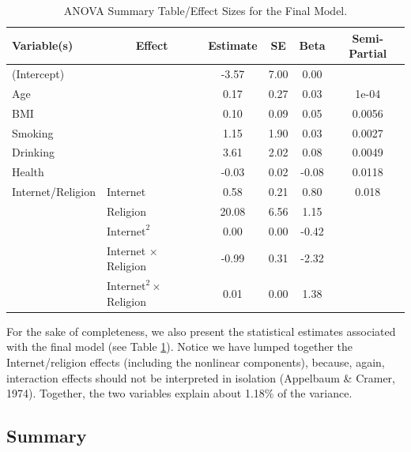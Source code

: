 \documentclass[
  man,floatsintext]{apa6}
\begin{document}
\begin{table}[tbp]

\begin{center}
\begin{threeparttable}

\caption{\label{tab:finalmodests}ANOVA Summary Table/Effect Sizes for the Final Model.}

\begin{tabular}{llcccc}
\toprule
Variable(s) & \multicolumn{1}{c}{Effect} & \multicolumn{1}{c}{Estimate} & \multicolumn{1}{c}{SE} & \multicolumn{1}{c}{Beta} & \multicolumn{1}{c}{Semi-Partial}\\
\midrule
(Intercept) &  & -3.57 & 7.00 & 0.00 & \\
Age &  & 0.17 & 0.27 & 0.03 & 1e-04\\
BMI &  & 0.10 & 0.09 & 0.05 & 0.0056\\
Smoking &  & 1.15 & 1.90 & 0.03 & 0.0027\\
Drinking &  & 3.61 & 2.02 & 0.08 & 0.0049\\
Health &  & -0.03 & 0.02 & -0.08 & 0.0118\\
Internet/Religion & Internet & 0.58 & 0.21 & 0.80 & 0.018\\
 & Religion & 20.08 & 6.56 & 1.15 & \\
 & $\text{Internet}^2$ & 0.00 & 0.00 & -0.42 & \\
 & Internet $\times$ Religion & -0.99 & 0.31 & -2.32 & \\
 & $\text{Internet}^2 \times$ Religion & 0.01 & 0.00 & 1.38 & \\
\bottomrule
\end{tabular}

\end{threeparttable}
\end{center}

\end{table}

For the sake of completeness, we also present the statistical estimates associated with the final model (see Table \ref{tab:finalmodests}). Notice we have lumped together the Internet/religion effects (including the nonlinear components), because, again, interaction effects should not be interpreted in isolation (Appelbaum \& Cramer, 1974). Together, the two variables explain about 1.18\% of the variance.

\subsection{Summary}\label{summary}
\end{document}
